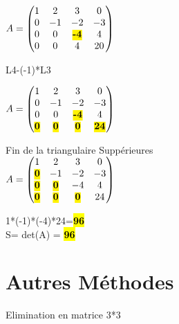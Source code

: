 \vspace{5mm} %

$
A =
\begin{pmatrix}
  1 & 2 & 3 & 0    \\
  0 & -1 & -2 & -3 \\
  0 & 0 & \hl{\textbf{-4}} & 4   \\
  0 & 0 & 4 & 20  \\
\end{pmatrix}
$

\vspace{5mm} %

L4-(-1)*L3\\

\vspace{5mm} %

$
A =
\begin{pmatrix}
  1 & 2 & 3 & 0    \\
  0 & -1 & -2 & -3 \\
  0 & 0 & \hl{\textbf{-4}} & 4   \\
  \hl{\textbf{0}} & \hl{\textbf{0}} & \hl{\textbf{0}} & \hl{\textbf{24}}  \\
\end{pmatrix}
$

Fin de la triangulaire Suppérieures \\

$
A =
\begin{pmatrix}
  1 & 2 & 3 & 0    \\
  \hl{\textbf{0}} & -1 & -2 & -3 \\
  \hl{\textbf{0}} & \hl{\textbf{0}} & -4 & 4   \\
  \hl{\textbf{0}} & \hl{\textbf{0}} & \hl{\textbf{0}} & 24  \\
\end{pmatrix}
$

\vspace{5mm} %

1*(-1)*(-4)*24=\hl{\textbf{96}} \\
\vspace{4mm} %
S= det(A) = \hl{\textbf{96}} \\

\section{Autres Méthodes}

Elimination en matrice 3*3 \\

